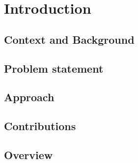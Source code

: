 \chapter{Introduction}\label{chapter:introduction}

\section{Context and Background}
\section{Problem statement}
\section{Approach}
\section{Contributions}
\section{Overview}

